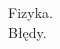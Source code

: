 \documentclass[a4paper,11pt]{article}
\begin{document}
\begin{center}
\LARGE{Fizyka.}\\
\large{Błędy.}
\end{center}





%
%
\end{document}
